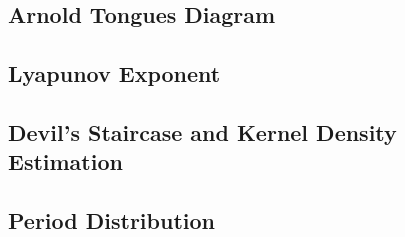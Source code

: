 \subsection{Arnold Tongues Diagram}


\subsection{Lyapunov Exponent}


\subsection{Devil's Staircase and Kernel Density Estimation}



\subsection{Period Distribution}







